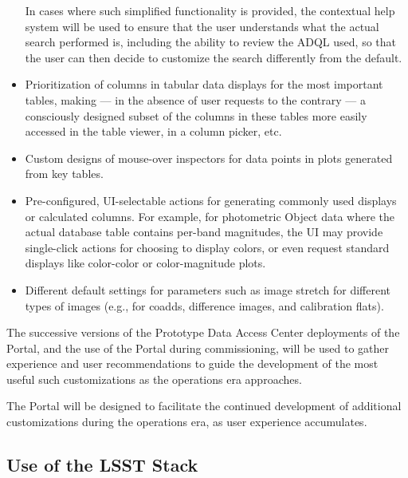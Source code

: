 \begin{itemize}
In cases where such simplified functionality is provided, the contextual help system will be used to ensure that the user understands what the actual search performed is, including the ability to review the ADQL used, so that the user can then decide to customize the search differently from the default.
\item Prioritization of columns in tabular data displays for the most important tables, making --- in the absence of user requests to the contrary --- a consciously designed subset of the columns in these tables more easily accessed in the table viewer, in a column picker, etc.
\item Custom designs of mouse-over inspectors for data points in plots generated from key tables.
\item Pre-configured, UI-selectable actions for generating commonly used displays or calculated columns.
For example, for photometric Object data where the actual database table contains per-band magnitudes, the UI may provide single-click actions for choosing to display colors, or even request standard displays like color-color or color-magnitude plots.
\item Different default settings for parameters such as image stretch for different types of images (e.g., for coadds, difference images, and calibration flats).
\end{itemize}

The successive versions of the Prototype Data Access Center deployments of the Portal, and the use of the Portal during commissioning, will be used to gather experience and user recommendations to guide the development of the most useful such customizations as the operations era approaches.

The Portal will be designed to facilitate the continued development of additional customizations during the operations era, as user experience accumulates.

\subsection{Use of the LSST Stack}\label{use-of-the-lsst-stack}

